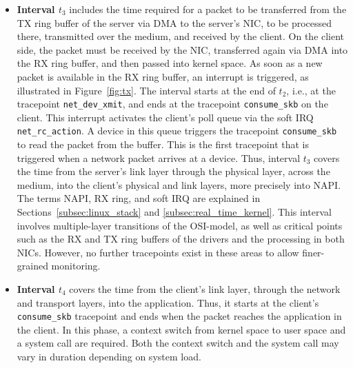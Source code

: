 \begin{itemize}
    \item \textbf{Interval $t_3$}\label{itm:t3} includes the time required for a packet to be transferred from the TX ring buffer of the server via \ac{DMA} to the server's \ac{NIC}, to be processed there, transmitted over the medium, and received by the client.
          On the client side, the packet must be received by the \ac{NIC}, transferred again via \ac{DMA} into the RX ring buffer, and then passed into kernel space.  
          As soon as a new packet is available in the RX ring buffer, an interrupt is triggered, as illustrated in Figure~\ref{fig:tx}. 
          The interval starts at the end of $t_2$, i.e., at the tracepoint \texttt{net\_dev\_xmit}, and ends at the tracepoint \texttt{consume\_skb} on the client.    
          This interrupt activates the client's poll queue via the soft IRQ \texttt{net\_rc\_action}.  
          A device in this queue triggers the tracepoint \texttt{consume\_skb} to read the packet from the buffer. 
          This is the first tracepoint that is triggered when a network packet arrives at a device. 
          Thus, interval $t_3$ covers the time from the server's link layer through the physical layer, across the medium, into the client's physical and link layers, more precisely into NAPI.  
          The terms NAPI, RX ring, and soft IRQ are explained in Sections~\ref{subsec:linux_stack} and \ref{subsec:real_time_kernel}.  
          This interval involves multiple-layer transitions of the \ac{OSI-model}, as well as critical points such as the RX and TX ring buffers of the drivers and the processing in both \acp{NIC}.  
          However, no further tracepoints exist in these areas to allow finer-grained monitoring.  

    \item \textbf{Interval $t_4$}\label{itm:t4} covers the time from the client's link layer, through the network and transport layers, into the application.
          Thus, it starts at the client's \texttt{consume\_skb} tracepoint and ends when the packet reaches the application in the client.    
          In this phase, a context switch from kernel space to user space and a system call are required.  
          Both the context switch and the system call may vary in duration depending on system load.  


\end{itemize}
